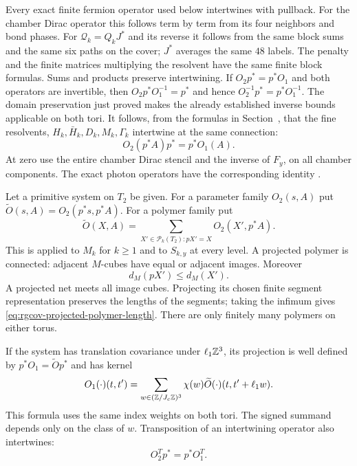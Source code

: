 Every exact finite fermion operator used below intertwines
with pullback. For the chamber Dirac operator this follows
term by term from its four neighbors and bond phases.
For $\mathcal Q_k=Q_kJ^*$ and its reverse it follows from
the same block sums and the same six paths on the cover;
$J^*$ averages the same $48$ labels.
The penalty and the finite matrices multiplying the
resolvent have the same finite block formulas.
Sums and products preserve intertwining.
If $O_2p^*=p^*O_1$ and both operators are invertible,
then
$O_2p^*O_1^{-1}=p^*$ and hence
$O_2^{-1}p^*=p^*O_1^{-1}$.
The domain preservation just proved makes the already
established inverse bounds applicable on both tori.
It follows, from the formulas in Section~,
that the fine resolvents, $H_k,\bar H_k,D_k,M_k,\Gamma_k$
intertwine at the same connection:
\begin{equation}\label{eq:rgcov-exact-fermion-intertwining}
 O_2(p^*A)p^*=p^*O_1(A).
\end{equation}
At zero use the entire chamber Dirac stencil and the
inverse of $F_y$, on all chamber components.
The exact photon operators have the corresponding
identity .

Let a primitive system on $T_2$ be given.
For a parameter family $O_2(s,A)$ put
$\widetilde O(s,A)=O_2(p^*s,p^*A)$.
For a polymer family put
\[
 \widetilde O(X,A)=\sum_{X'\in\mathcal P_k(T_2):pX'=X}
                                                    O_2(X',p^*A).
\]
This is applied to $M_k$ for $k\ge1$ and to $S_{k,y}$
at every level. A projected polymer is connected:
adjacent $M$-cubes have equal or adjacent images.
Moreover
\begin{equation}\label{eq:rgcov-projected-polymer-length}
                           d_M(pX')\le d_M(X').
\end{equation}
A projected net meets all image cubes. Projecting its chosen
finite segment representation preserves the lengths of the segments;
taking the infimum gives \eqref{eq:rgcov-projected-polymer-length}.
There are only finitely many polymers on either torus.

\begin{proposition}\label{prop:rgcov-kernel-projection}
If the system has translation covariance under
$\ell_1\mathbb Z^3$, its projection is well defined by
$p^*O_1=\widetilde Op^*$ and has kernel
\begin{equation}\label{eq:rgcov-signed-image-kernel}
 O_1(\cdot)(t,t')
  =\sum_{w\in(\mathbb Z/J_c\mathbb Z)^3}\chi(w)
                       \widetilde O(\cdot)(t,t'+\ell_1w).
\end{equation}
This formula uses the same index weights on both tori.
The signed summand depends only on the class of $w$.
Transposition of an intertwining operator also intertwines:
\begin{equation}\label{eq:rgcov-transpose-intertwining}
                          O_2^Tp^*=p^*O_1^T.
\end{equation}
\end{proposition}

